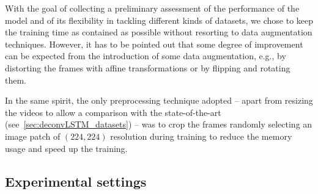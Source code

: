 With the goal of collecting a preliminary assessment of the performance of the
model and of its flexibility in tackling different kinds of datasets, we chose
to keep the training time as contained as possible without resorting to data
augmentation techniques. However, it has to be pointed out that some degree of
improvement can be expected from the introduction of some data augmentation,
e.g., by distorting the frames with affine transformations or by flipping and
rotating them.

In the same spirit, the only preprocessing technique adopted -- apart from
resizing the videos to allow a comparison with the state-of-the-art
(see~\autoref{sec:deconvLSTM_datasets}) -- was to crop the frames randomly
selecting an image patch of $(224, 224)$ resolution during training to reduce
the memory usage and speed up the training.

\subsection{Experimental settings}\label{sec:deconvLSTM_settings}

